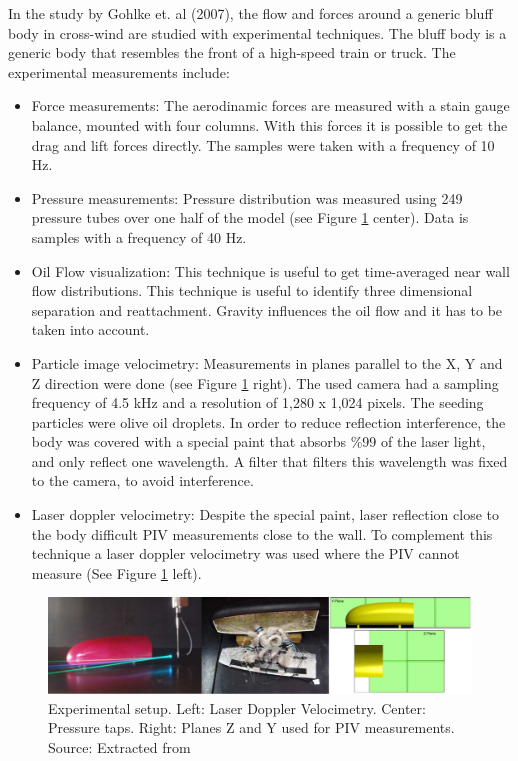\documentclass[journal]{new-aiaa}
\begin{document}
In the study by Gohlke et. al (2007), the flow and forces around a generic bluff body in cross-wind are studied with experimental techniques. The bluff body is a generic body that resembles the front of a high-speed train or truck. The experimental measurements include:
\begin{itemize}
\item Force measurements: The aerodinamic forces are measured with a stain gauge balance, mounted with four columns. With this forces it is possible to get the drag and lift forces directly. The samples were taken with a frequency of 10 Hz.
\item Pressure measurements: Pressure distribution was measured using 249 pressure tubes over one half of the model (see Figure \ref{fig:Exp} center). Data is samples with a frequency of 40 Hz. 
\item Oil Flow visualization: This technique is useful to get time-averaged near wall flow distributions. This technique is useful to identify three dimensional separation and reattachment. Gravity influences the oil flow and it has to be taken into account. 
\item Particle image velocimetry: Measurements in planes parallel to the X, Y and Z direction were done (see Figure \ref{fig:Exp} right). The used camera had a sampling frequency of 4.5 kHz and a resolution of 1,280 x 1,024 pixels. The seeding particles were olive oil droplets. In order to reduce reflection interference, the body was covered with a special paint that absorbs \%99 of the laser light, and only reflect one wavelength. A filter that filters this wavelength was fixed to the camera, to avoid interference. 
\item Laser doppler velocimetry: Despite the special paint, laser reflection close to the body difficult PIV measurements close to the wall. To complement this technique a laser doppler velocimetry was used where the PIV cannot measure (See Figure \ref{fig:Exp} left). 
\end{itemize}


\begin{figure}[H]
\begin{center}
\includegraphics[width=1\textwidth]{Images/federico/Figure10}
\caption{Experimental setup. Left: Laser Doppler Velocimetry. Center: Pressure taps. Right: Planes Z and Y used for PIV measurements. Source: Extracted from \cite{Gohlke2007}}
\label{fig:Exp}
\end{center}
\end{figure}
\end{document}
